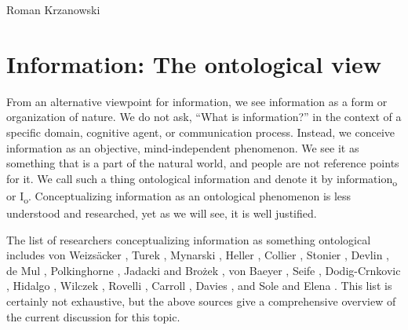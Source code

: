 \begin{artengenv}{Roman Krzanowski}
\section{Information: The ontological view}
From an alternative viewpoint for information, we see information as a form or organization of nature. We do not ask, ``What is information?'' in the context of a specific domain, cognitive agent, or communication process. Instead, we conceive information as an objective, mind-independent phenomenon. We see it as something that is a part of the natural world, and people are not reference points for it. We call such a thing ontological information and denote it by information\textsubscript{o} or I\textsubscript{o}. Conceptualizing information as an ontological phenomenon is less understood and researched, yet as we will see, it is well justified.

The list of researchers conceptualizing information as something ontological includes von Weizsäcker
\parencite*[][]{weizsacker_einheit_1971}, %
 Turek 
\parencite*[][]{turek_filozoficzne_1978}, %
 Mynarski 
\parencite*[][]{mynarski_elementy_1981}, %
 Heller 
\parencites*[][]{heller_ewolucja_1987}[][]{heller_elementy_2014}, %
 Collier 
\parencite*[][]{hanson_intrinsic_1990}, %
 Stonier 
\parencite*[][]{stonier_information_1990}, %
 Devlin 
\parencite*[][]{devlin_logic_1991}, %
 de Mul 
\parencite*[][]{mul_informatization_1999}, %
 Polkinghorne 
\parencite*[][]{polkinghorne_faith_2000}, %
 Jadacki and Brożek 
\parencite*[][]{heller_na_2005}, %
 von Baeyer 
\parencite*[][]{baeyer_information_2005}, %
 Seife 
\parencite*[][]{seife_decoding_2006}, %
 Dodig-Crnkovic 
\parencite*[][]{dodig-crnkovic_alan_2012}, %
 Hidalgo 
\parencite*[][]{hidalgo_why_2015}, %
 Wilczek 
\parencite*[][]{wilczek_beautiful_2015}, %
 Rovelli 
\parencite*[][]{rovelli_meaning_2016}, %
 Carroll 
\parencite*[][]{carroll_big_2017}, %
 Davies 
\parencite*[][]{davies_demon_2019}, %
 and Sole and Elena 
\parencite*[][]{sole_viruses_2019}. %
 This list is certainly not exhaustive, but the above sources give a comprehensive overview of the current discussion for this topic.


\end{artengenv}

